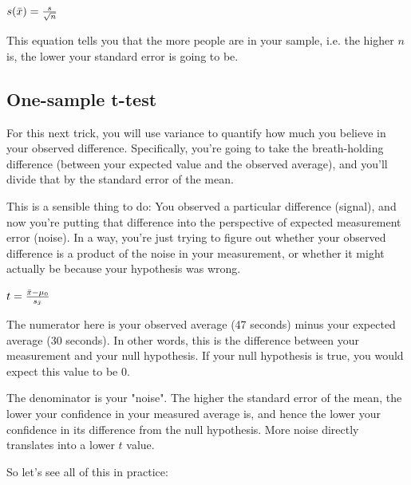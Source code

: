 \documentclass[11pt]{article}
\begin{document}
\(s(\bar{x}) = {{s} \over {\sqrt{n}}}\)

This equation tells you that the more people are in your sample, i.e.
the higher \(n\) is, the lower your standard error is going to be.

    \subsection{One-sample t-test}\label{one-sample-t-test}

For this next trick, you will use variance to quantify how much you
believe in your observed difference. Specifically, you're going to take
the breath-holding difference (between your expected value and the
observed average), and you'll divide that by the standard error of the
mean.

This is a sensible thing to do: You observed a particular difference
(signal), and now you're putting that difference into the perspective of
expected measurement error (noise). In a way, you're just trying to
figure out whether your observed difference is a product of the noise in
your measurement, or whether it might actually be because your
hypothesis was wrong.

\(t = {{\bar{x} - \mu_{0}} \over {s_{\bar{x}}}}\)

The numerator here is your observed average (47 seconds) minus your
expected average (30 seconds). In other words, this is the difference
between your measurement and your null hypothesis. If your null
hypothesis is true, you would expect this value to be 0.

The denominator is your "noise". The higher the standard error of the
mean, the lower your confidence in your measured average is, and hence
the lower your confidence in its difference from the null hypothesis.
More noise directly translates into a lower \(t\) value.

So let's see all of this in practice:
\end{document}
